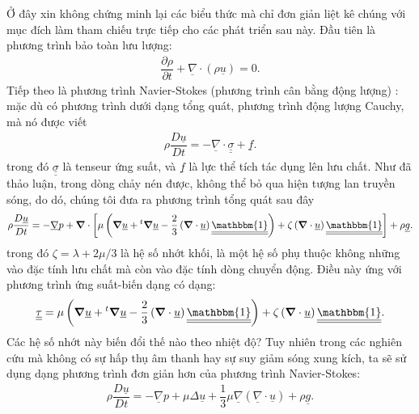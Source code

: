 \documentclass[../../../main.tex]{subfiles}
\begin{document}
	Ở đây xin không chứng minh lại các biểu thức mà chỉ đơn giản liệt kê chúng với mục đích làm tham chiếu trực tiếp cho các phát triển sau này. Đầu tiên là phương trình bảo toàn lưu lượng:
		\begin{align}\label{eq:conserve_mass}
			\dfrac{\partial\rho}{\partial t}+\underline{\nabla}\cdot\left(\rho\underline{u}\right)=0.
		\end{align}
	Tiếp theo là phương trình Navier-Stokes (phương trình cân bằng động lượng) : mặc dù có phương trình dưới dạng tổng quát, phương trình động lượng Cauchy, mà nó được viết
		\begin{align}
			\rho\dfrac{D\underline{u}}{Dt}=-\underline\nabla\cdot\underline{\underline{\sigma}}+\underline{f}.
		\end{align}
	trong đó $\underline{\underline{\sigma}}$ là tenseur ứng suất, và $\underline{f}$ là lực thể tích tác dụng lên lưu chất. Như đã thảo luận, trong dòng chảy nén được, không thể bỏ qua hiện tượng lan truyền sóng, do dó, chúng tôi đưa ra phương trình tổng quát sau đây
		\begin{align}\label{eq:nse}
			\rho\dfrac{D\underline{u}}{Dt}=-\underline{\nabla}p+\vnabla\cdot\left[\mu\left(\vnabla\underline{u}+{}^t\vnabla\underline{u}-\dfrac{2}{3}\left(\vnabla\cdot\underline{u}\right)\underline{\underline{\mathbbm{1}}}\right)+\zeta\left(\vnabla\cdot\underline{u}\right)\underline{\underline{\mathbbm{1}}}\right]+\rho\underline{g}.
		\end{align}
	trong đó $\zeta=\lambda+2\mu/3$ là hệ số nhớt khối, là một hệ số phụ thuộc không những vào đặc tính lưu chất mà còn vào đặc tính dòng chuyển động. Điều này ứng với phương trình ứng suất-biến dạng có dạng:
		\begin{align}
			\underline{\underline{\tau}}=\mu\left(\vnabla\underline{u}+{}^t\vnabla\underline{u}-\dfrac{2}{3}\left(\vnabla\cdot\underline{u}\right)\underline{\underline{\mathbbm{1}}}\right)+\zeta\left(\vnabla\cdot\underline{u}\right)\underline{\underline{\mathbbm{1}}}.
		\end{align}
	Các hệ số nhớt này biến đổi thế nào theo nhiệt độ? Tuy nhiên trong các nghiên cứu mà không có sự hấp thụ âm thanh hay sự suy giảm sóng xung kích, ta sẽ sử dụng dạng phương trình đơn giản hơn của phương trình Navier-Stokes:
		\begin{align}
			\boxed{
				\rho\dfrac{D\underline{u}}{Dt}=-\underline{\nabla}p+\mu\Delta\underline{u}+\dfrac{1}{3}\mu\underline{\nabla}\left(\underline{\nabla}\cdot\underline{u}\right)+\rho\underline{g}.
			}
		\end{align}
\end{document}
